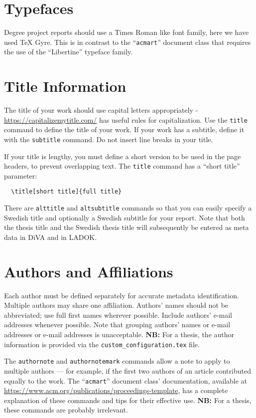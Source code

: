 \documentclass[manuscript, screen]{timtm}
\begin{document}
\section{Typefaces}

Degree project reports should use a Times Roman like font family, here we have used TeX Gyre. This is in contrast to the ``\verb|acmart|'' document class that requires the use of the ``Libertine'' typeface family.

\section{Title Information}

The title of your work should use capital letters appropriately -
\url{https://capitalizemytitle.com/} has useful rules for
capitalization. Use the {\verb|title|} command to define the title of
your work. If your work has a subtitle, define it with the
{\verb|subtitle|} command.  Do not insert line breaks in your title.

If your title is lengthy, you must define a short version to be used
in the page headers, to prevent overlapping text. The \verb|title|
command has a ``short title'' parameter:
\begin{verbatim}
  \title[short title]{full title}
\end{verbatim}

There are \verb|alttitle| and \verb|altsubtitle| commands so that you can easily specify a Swedish title and optionally a Swedish subtitle for your report. Note that both the thesis title and the Swedish thesis title will subsequently be entered as meta data in DiVA and in LADOK.

\section{Authors and Affiliations}

Each author must be defined separately for accurate metadata
identification. Multiple authors may share one affiliation. Authors'
names should not be abbreviated; use full first names wherever
possible. Include authors' e-mail addresses whenever possible. Note that grouping authors' names or e-mail addresses or e-mail
addresses is unacceptable. \textbf{NB:} For a thesis, the author information is provided via the \texttt{custom\_configuration.tex} file.

The \verb|authornote| and \verb|authornotemark| commands allow a note
to apply to multiple authors --- for example, if the first two authors
of an article contributed equally to the work. The ``\verb|acmart|'' document class'  documentation, available at
\url{https://www.acm.org/publications/proceedings-template}, has a
complete explanation of these commands and tips for their effective
use. \textbf{NB:} For a thesis, these commands are probably irrelevant.
\end{document}
